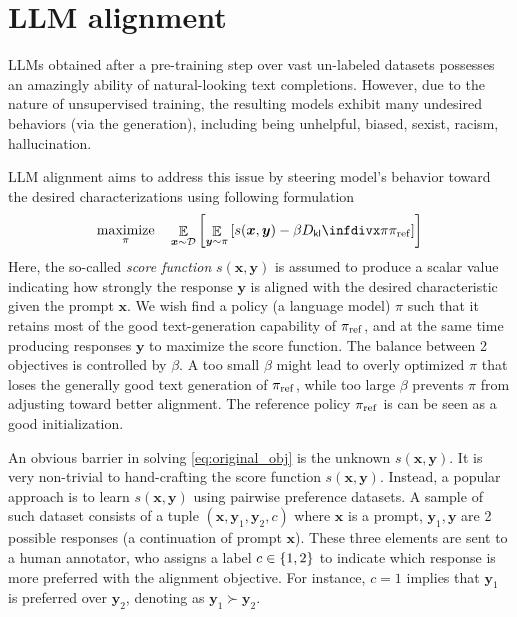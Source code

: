 \documentclass[11pt,a4paper]{article}
\begin{document}
\section{LLM alignment}%
\label{sec:introduction}
LLMs obtained after a pre-training step over vast un-labeled datasets possesses an amazingly ability of  natural-looking text completions. However, due to the nature of unsupervised training, the resulting models exhibit many undesired behaviors (via the generation), including being unhelpful, biased, sexist, racism, hallucination.

LLM alignment aims to address this issue by steering model's behavior toward the desired characterizations using following formulation
\begin{equation}
\label{eq:original_obj}
\maximize_{\pi} \quad  \mathop{\mathbb{E}}_{\bm{x} \sim \mathcal{D}} \left[  \mathop{\mathbb{E}}_{\bm{y} \sim \pi} \left[ s(\bm{x}, \bm{y})  - \beta \Dkl{\pi}{\pi_{\rm ref}}\right]
\right] 
\end{equation}
Here, the so-called \textit{score function} $s(\bm{x}, \bm{y})$ is assumed to produce a scalar value indicating how strongly the response $\bm{y}$ is aligned with the desired characteristic given the prompt $\bm{x}$.
We wish find a policy (a language model) $\pi$ such that it retains most of the good text-generation capability of $\pi_{\rm ref}$, and at the same time producing responses $\bm{y}$ to maximize the score function.
The balance between 2 objectives is controlled by $\beta$. A too small $\beta$ might lead to overly optimized $\pi$ that loses the generally good text generation of $\pi_{\rm ref}$, while too large $\beta$ prevents $\pi$ from adjusting toward better alignment.
The reference policy $\pi_{\rm ref}$ is can be seen as a good initialization.

An obvious barrier in solving \eqref{eq:original_obj} is the unknown $s(\bm{x}, \bm{y})$. It is very non-trivial to hand-crafting the score function $s(\bm{x}, \bm{y})$. Instead, a popular approach is to learn $s(\bm{x}, \bm{y})$ using pairwise preference datasets. A sample of such dataset consists of a tuple $(\bm{x}, \bm{y}_1, \bm{y}_2, c)$ 
where $\bm{x}$ is a prompt, $\bm{y}_1, \bm{y}$ are 2 possible responses (a continuation of prompt $\bm{x}$). These three elements are sent to a human annotator, who assigns a label $c\in \left\{1,2\right\}$ to indicate which response is more preferred with the alignment objective. For instance, $c=1$ implies that $\bm{y}_1$ is preferred over $\bm{y}_2$, denoting as $\bm{y}_1 \succ \bm{y}_2$.
\end{document}
